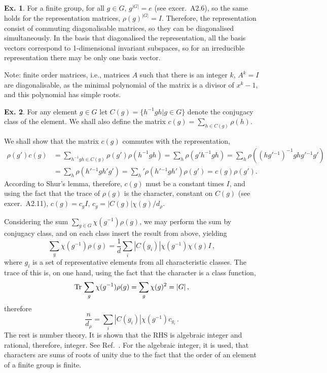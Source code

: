 \documentclass[a4paper,12pt]{article}
\def\Tr{\ensuremath{\mathop{\rm Tr}}{}}
\theoremstyle{definition}
\newtheorem{exercise}{Ex.}[section]
\begin{document}
\begin{exercise}
 For a finite group, for all $g\in G$, $g^{|G|}=e$ (see excer.\ A2.6), so the same holds for the representation matrices, $\rho(g)^{|G|}=I$. Therefore, the representation consist of commuting diagonalisable matrices, so they can be diagonalised simultaneously. In the basis that diagonalised the representation, all the basis vectors correspond to 1-dimensional invariant subspaces, so for an irreducible representation there may be only one basis vector.
 
 Note: finite order matrices, i.e., matrices $A$ such that there is an integer $k$, $A^k=I$ are diagonalisable, as the minimal polynomial of the matrix is a divisor of $x^k-1$, and this polynomial has simple roots.
\end{exercise}

\begin{exercise}
 For any element $g\in G$ let $C(g) = \{ h^{-1}gh| g\in G\}$ denote the conjugacy class of the element. We shall also define the matrix $c(g) = \sum_{h\in C(g)} \rho(h)$.
 
 We shall show that the matrix $c(g)$ commutes with the representation,
 \[
  \begin{aligned}
   \rho(g') c(g) &= \sum_{h^{-1}gh\in C(g)} \rho(g')\rho(h^{-1}gh) = \sum_h \rho(g' h^{-1}gh) = \sum_h\rho( (hg'{}^{-1})^{-1} g hg'{}^{-1}g')\\ &= \sum_h \rho( h'{}^{-1}g h' g') = \sum_h' \rho(h'{}^{-1}gh') \rho(g') = c(g)\rho(g').
  \end{aligned}
 \]
 According to Shur's lemma, therefore, $c(g)$ must be a constant times $I$, and using the fact that the trace of $\rho(g)$ is the character, constant on $C(g)$ (see excer.\ A2.11), $c(g) = c_g I$, $c_g = |C(g)| \chi(g)/ d_\rho$.
 
 Considering the sum $\sum_{g\in G}\chi(g^{-1})\rho(g)$,  we may perform the sum by conjugacy class, and on each class insert the result from above, yielding
 \[
  \sum_g \chi(g^{-1}) \rho(g) = \frac{1}{d}\sum_i |C(g_i)| \chi(g^{-1}) \chi(g) I\,,
 \]
 where $g_i$ is a set of representative elements from all characteristic classes. The trace of this is, on one hand, using the fact that the character is a class function,
 \[
  \Tr \sum_g \chi(g^{-1}) \rho(g) = \sum_g \chi(g)^2 = |G|\,,
 \]
 therefore
 \[
  \frac{n}{d_\rho} = \sum_i |C(g_i)| \chi(g^{-1}) c_{g_i}\,.
 \]
 The rest is number theory. It is shown that the RHS is algebraic integer and rational, therefore, integer. See Ref.\ \cite{Hall}. For the algebraic integer, it is used, that characters are sums of roots of unity due to the fact that the order of an element of a finite group is finite.
\end{exercise}
\end{document}
